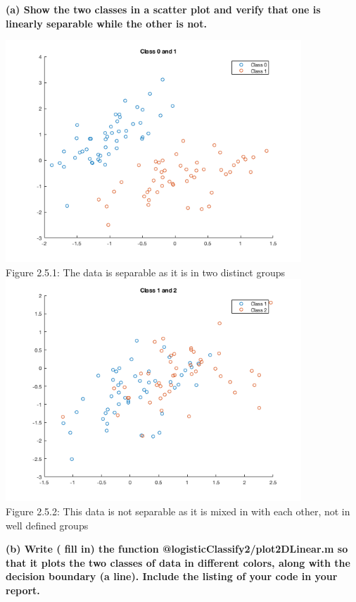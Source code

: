 \documentclass[]{scrreprt}   %
\begin{document}
\textbf{(a) Show the two classes in a scatter plot and verify that one is linearly separable while the other is not.}
\begin{center}
	\includegraphics[width=30em,keepaspectratio]{p5figure1.png}\\
	{Figure 2.5.1: The data is separable as it is in two distinct groups}
		\includegraphics[width=30em,keepaspectratio]{p5figure2.png}\\
	{Figure 2.5.2: This data is not separable as it is mixed in with each other, not in well defined groups}
\end{center} 

\textbf{(b) Write ( fill in) the function @logisticClassify2/plot2DLinear.m so that it plots the two classes of data in different colors, along with the decision boundary (a line). Include the listing of your code in your report.}


\bigbreak
\end{document}
